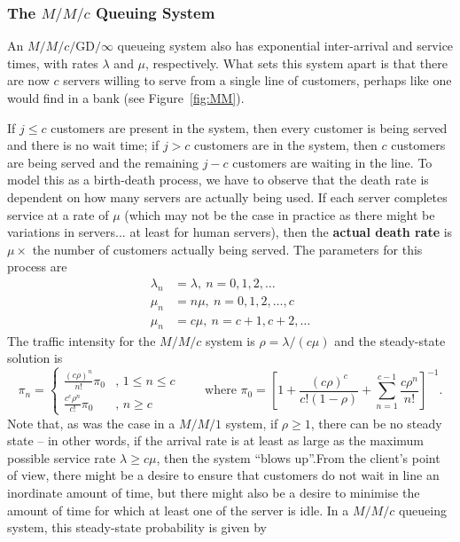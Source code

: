 \subsubsection{The $M/M/c$ Queuing System}
An $M/M/c/\textrm{GD}/\infty$ queueing system also has exponential inter-arrival and service times, with rates $\lambda$ and $\mu$, respectively. What sets this system apart is that there are now $c$ servers willing to serve from a single line of customers, perhaps like one would find in a bank (see Figure~\ref{fig:MM}). \par If $j \leq c$ customers are present in the system, then every customer is being served and there is no wait time; if $j > c$ customers are in the system, then $c$ customers are being served and the remaining $j - c$ customers are waiting in the line. \newl
To model this as a birth-death process, we have to observe that the death rate is dependent on how many servers are actually being used. \newpage\noindent If each server completes service at a rate of $\mu$ (which may not be the case in practice as there might be variations in servers... at least for human servers), then the \textbf{actual death rate} is $\mu \times$ the number of customers actually being served. The parameters for this process are
\begin{align*}
\lambda_{n} &= \lambda, \ n=0,1,2,\ldots \\ 
\mu_n &= n\mu, \ n=0,1,2, \ldots, c \\
\mu_{n} &= c\mu,\  n=c+1,c+2,\ldots 
\end{align*}
The traffic intensity for the $M/M/c$ system is $\rho = \lambda/(c \mu)$ and the steady-state solution is 
\begin{equation} 
 \pi_{n} = 
\begin{cases}
     \frac{\left(c \rho\right)^{n}}{n!} \pi_{0}      & \text{, $1\leq n \leq c$}  \\ 
     \frac{c^{c} \rho^{n}}{c!} \pi_{0}   & \text{, $n \geq c$} 
\end{cases}
\nonumber\qquad  \text{where  }
\pi_{0} = \left[1 + \frac{\left(c \rho\right)^{c}}{c! \left(1-\rho\right)} + \sum^{c-1}_{n=1} \frac{c \rho^{n}}{n!}\right]^{-1}.
\end{equation}
\normalsize  
Note that, as was the case in a $M/M/1$ system, if $\rho \geq 1$, there can be no steady state -- in other words, if the arrival rate is at least as large as the maximum possible service rate $\lambda \geq c \mu$, then the system ``blows up''.\newl From the client's point of view, there might be a desire to ensure that customers do not wait in line an inordinate amount of time, but there might also be a desire to minimise the amount of time for which at least one of the server is idle. In a $M/M/c$ queueing system, this steady-state probability is given by 

